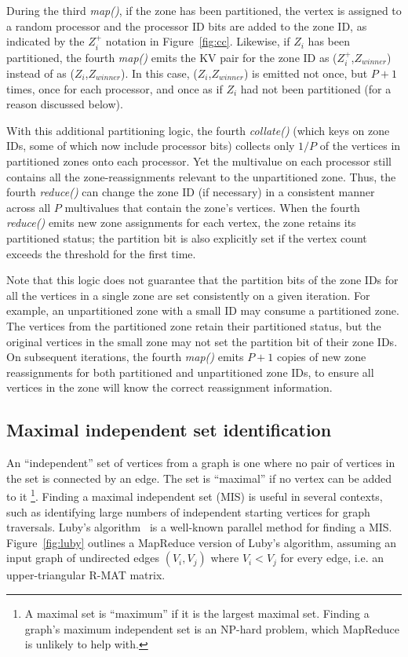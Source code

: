 During the third {\it map()}, if the zone has been partitioned, the
vertex is assigned to a random processor and the processor ID bits are
added to the zone ID, as indicated by the $Z_i^+$ notation in
Figure~\ref{fig:cc}.  Likewise, if $Z_i$ has been partitioned, the
fourth {\it map()} emits the KV pair for the zone ID as
($Z_i^+$,$Z_{winner}$) instead of as ($Z_i$,$Z_{winner}$).  In this
case, ($Z_i$,$Z_{winner}$) is emitted not once, but $P+1$ times, once
for each processor, and once as if $Z_i$ had not been partitioned (for
a reason discussed below).

With this additional partitioning logic, the fourth {\it collate()}
(which keys on zone IDs, some of which now include processor bits)
collects only $1/P$ of the vertices in partitioned zones onto each
processor.  Yet the multivalue on each processor still contains all
the zone-reassignments relevant to the unpartitioned zone.  Thus, the
fourth {\it reduce()} can change the zone ID (if necessary) in a
consistent manner across all $P$ multivalues that contain the zone's
vertices.  When the fourth {\it reduce()} emits new zone assignments
for each vertex, the zone retains its partitioned status; the
partition bit is also explicitly set if the vertex count exceeds the
threshold for the first time.

Note that this logic does not guarantee that the partition bits of the
zone IDs for all the vertices in a single zone are set consistently on
a given iteration.  For example, an unpartitioned zone with a small ID
may consume a partitioned zone.  The vertices from the partitioned
zone retain their partitioned status, but the original vertices in the
small zone may not set the partition bit of their zone IDs.  On
subsequent iterations, the fourth {\it map()} emits $P+1$ copies of
new zone reassignments for both partitioned and unpartitioned zone
IDs, to ensure all vertices in the zone will know the correct
reassignment information.

\subsection{Maximal independent set identification}

An ``independent'' set of vertices from a graph is one where no pair
of vertices in the set is connected by an edge.  The set is
``maximal'' if no vertex can be added to it \footnote{A maximal set is
``maximum'' if it is the largest maximal set.  Finding a graph's
maximum independent set is an NP-hard problem, which MapReduce is
unlikely to help with.}.  Finding a maximal independent set (MIS) is
useful in several contexts, such as identifying large numbers of
independent starting vertices for graph traversals.  Luby's
algorithm~\cite{Luby86} is a well-known parallel method for finding a
MIS.  Figure~\ref{fig:luby} outlines a MapReduce version of Luby's
algorithm, assuming an input graph of undirected edges $(V_i,V_j)$
where $V_i < V_j$ for every edge, i.e. an upper-triangular R-MAT
matrix.


